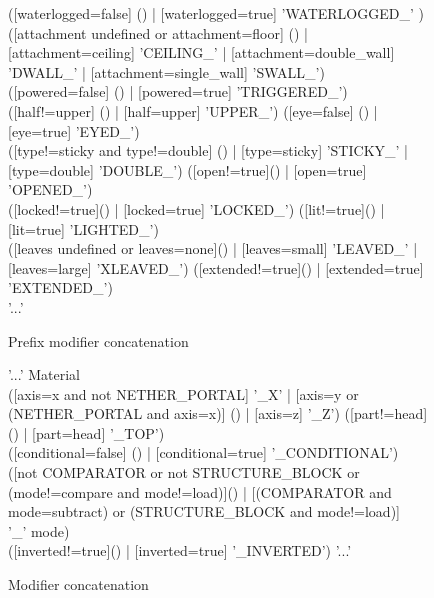 \begin{subfigures}
	\begin{figure}
		\begin{rail}
			([waterlogged=false] () | [waterlogged=true] 'WATERLOGGED\_' ) ([attachment undefined or attachment=floor] () | [attachment=ceiling] 'CEILING\_' | [attachment=double\_wall] 'DWALL\_' | [attachment=single\_wall] 'SWALL\_') \\
			([powered=false] () | [powered=true] 'TRIGGERED\_') ([half!=upper] () | [half=upper] 'UPPER\_') ([eye=false] () | [eye=true] 'EYED\_') \\
			([type!=sticky and type!=double] () | [type=sticky] 'STICKY\_' | [type=double] 'DOUBLE\_') ([open!=true]() | [open=true] 'OPENED\_') \\
			([locked!=true]() | [locked=true] 'LOCKED\_') ([lit!=true]() | [lit=true] 'LIGHTED\_') \\
			([leaves undefined or leaves=none]() | [leaves=small] 'LEAVED\_' | [leaves=large] 'XLEAVED\_') ([extended!=true]() | [extended=true] 'EXTENDED\_') \\
			'...'
		\end{rail}
		\label{rail:modifier-concatenation}
		\caption{Prefix modifier concatenation}
	\end{figure}

	\begin{figure}
		\begin{rail}
			'...'
			Material \\
			([axis=x and not NETHER\_PORTAL] '\_X' | [axis=y or (NETHER\_PORTAL and axis=x)] () | [axis=z] '\_Z') ([part!=head]() | [part=head] '\_TOP') \\
			([conditional=false] () | [conditional=true] '\_CONDITIONAL') \\
			([not COMPARATOR or not STRUCTURE\_BLOCK or (mode!=compare and mode!=load)]() | [(COMPARATOR and mode=subtract) or (STRUCTURE\_BLOCK and mode!=load)] \\ '\_' mode) \\
			([inverted!=true]() | [inverted=true] '\_INVERTED')
			'...'
		\end{rail}
		\caption{Modifier concatenation}
	\end{figure}


\end{subfigures}
